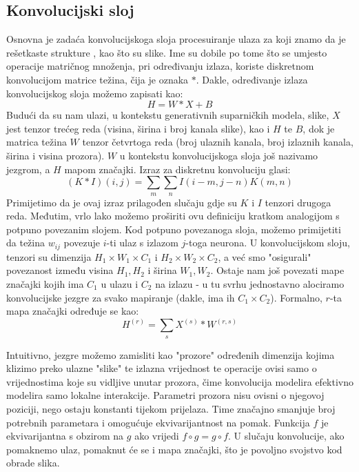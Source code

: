 \subsection{Konvolucijski sloj} 
Osnovna je zadaća konvolucijskoga sloja procesuiranje ulaza za koji znamo da je rešetkaste strukture , kao što su slike. Ime su dobile po tome što se umjesto operacije matričnog množenja, pri određivanju izlaza, koriste diskretnom konvolucijom matrice težina, čija je oznaka $*$. Dakle, određivanje izlaza konvolucijskog sloja možemo zapisati kao:
\begin{equation}
H = W * X + B
\end{equation}
Budući da su nam ulazi, u kontekstu generativnih suparničkih modela, slike, $X$ jest tenzor trećeg reda (visina, širina i broj kanala slike), kao i $H$ te $B$, dok je matrica težina $W$ tenzor četvrtoga reda (broj ulaznih kanala, broj izlaznih kanala, širina i visina prozora). $W$ u kontekstu konvolucijskoga sloja još nazivamo jezgrom, a $H$ mapom značajki. 
Izraz za diskretnu konvoluciju glasi:
\begin{equation}
(K * I)(i, j) = \sum_m\sum_nI(i - m, j - n)K(m, n)
\end{equation}
Primijetimo da je ovaj izraz prilagođen slučaju gdje su $K$ i $I$ tenzori drugoga reda. Međutim, vrlo lako možemo proširiti ovu definiciju kratkom analogijom s potpuno povezanim slojem. Kod potpuno povezanoga sloja, možemo primijetiti da težina $w_{ij}$ povezuje $i$-ti ulaz s izlazom $j$-toga neurona. U konvolucijskom sloju, tenzori su dimenzija $H_1 \times W_1 \times C_1$ i $H_2 \times W_2 \times C_2$, a već smo "osigurali" povezanost između visina $H_1, H_2$ i širina $W_1, W_2$. Ostaje nam još povezati mape značajki kojih ima $C_1$ u ulazu i $C_2$ na izlazu - u tu svrhu jednostavno alociramo konvolucijske jezgre za svako mapiranje (dakle, ima ih $C_1 \times C_2$). Formalno, $r$-ta mapa značajki određuje se kao:
\begin{equation}
H^{(r)} = \sum_s X^{(s)} * W^{(r, s)}
\end{equation}

Intuitivno, jezgre možemo zamisliti kao "prozore" određenih dimenzija kojima klizimo preko ulazne "slike" te izlazna vrijednost te operacije ovisi samo o vrijednostima koje su vidljive unutar prozora, čime konvolucija modelira efektivno modelira samo lokalne interakcije. Parametri prozora nisu ovisni o njegovoj poziciji, nego ostaju konstanti tijekom prijelaza. Time značajno smanjuje broj potrebnih parametara i omogućuje ekvivarijantnost na pomak. Funkcija $f$ je ekvivarijantna s obzirom na $g$ ako vrijedi $f \circ g = g \circ f$. U slučaju konvolucije, ako pomaknemo ulaz, pomaknut će se i mapa značajki, što je povoljno svojstvo kod obrade slika.

